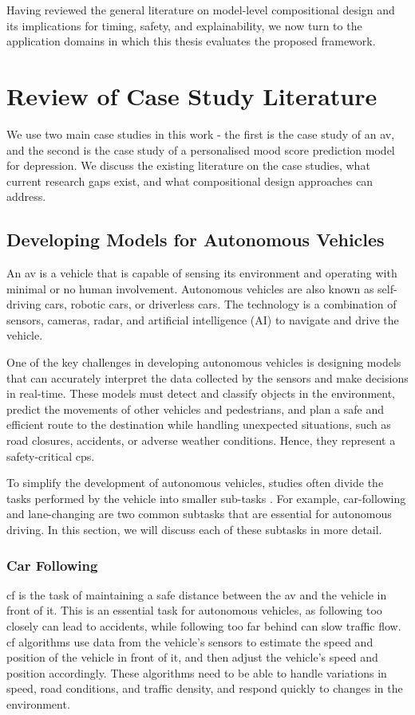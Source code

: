 Having reviewed the general literature on model-level compositional design and its implications for timing, safety, and explainability, we now turn to the application domains in which this thesis evaluates the proposed framework.


\section{Review of Case Study Literature}
\label{sec:lit_case_studies}
We use two main case studies in this work - the first is the case study of an \gls{av}, and the second is the case study of a personalised mood score prediction model for depression. We discuss the existing literature on the case studies, what current research gaps exist, and what compositional design approaches can address.

\subsection{Developing  Models for Autonomous Vehicles}

An  \gls{av} is a vehicle that is capable of sensing its environment and operating with minimal or no human involvement. Autonomous vehicles are also known as self-driving cars, robotic cars, or driverless cars. The technology is a combination of sensors, cameras, radar, and artificial intelligence (AI) to navigate and drive the vehicle. 

One of the key challenges in developing autonomous vehicles is designing models that can accurately interpret the data collected by the sensors and make decisions in real-time. These models must detect and classify objects in the environment, predict the movements of other vehicles and pedestrians, and plan a safe and efficient route to the destination while handling unexpected situations, such as road closures, accidents, or adverse weather conditions. Hence, they represent a safety-critical \gls{cps}.

To simplify the development of autonomous vehicles, studies often divide the tasks performed by the vehicle into smaller sub-tasks  \cite{zheng_recent_2014}. For example, car-following and lane-changing are two common subtasks that are essential for autonomous driving. In this section, we will discuss each of these subtasks in more detail.


\subsubsection{Car Following}
\gls{cf} is the task of maintaining a safe distance between the  \gls{av} and the vehicle in front of it. This is an essential task for autonomous vehicles, as following too closely can lead to accidents, while following too far behind can slow traffic flow. \gls{cf} algorithms use data from the vehicle's sensors to estimate the speed and position of the vehicle in front of it, and then adjust the vehicle's speed and position accordingly. These algorithms need to be able to handle variations in speed, road conditions, and traffic density, and respond quickly to changes in the environment.

